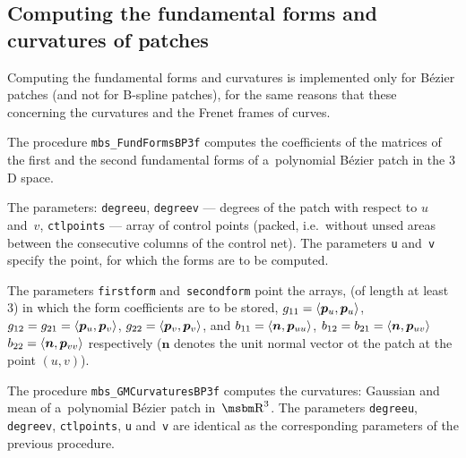 \subsection{Computing the fundamental forms and curvatures of patches}

Computing the fundamental forms and curvatures is implemented only
for B\'{e}zier patches (and not for B-spline patches), for the same
reasons that these concerning the curvatures and the Frenet frames
of curves.

\vspace{\bigskipamount}
The procedure \texttt{mbs\_FundFormsBP3f} computes the coefficients
of the matrices of the first and the second fundamental forms of
a~polynomial B\'{e}zier patch in the $3$D space.

The parameters: \texttt{degreeu}, \texttt{degreev} --- degrees of the patch
with respect to $u$ and~$v$, \texttt{ctlpoints} --- array of control
points (packed, i.e.\ without unsed areas between the consecutive
columns of the control net).
The parameters \texttt{u} and~\texttt{v} specify the point, for which
the forms are to be computed.

The parameters \texttt{firstform} and~\texttt{secondform} point the arrays,
(of length at least~$3$) in which the form coefficients are to be stored,
$g_{11}=\langle{\bm{p}_u},{\bm{p}_u}\rangle$, $g_{12}=g_{21}=\langle{\bm{p}_u},{\bm{p}_v}\rangle$,
$g_{22}=\langle{\bm{p}_v},{\bm{p}_v}\rangle$, and
$b_{11}=\langle{\bm{n}},{\bm{p}_{uu}}\rangle$, $b_{12}=b_{21}=\langle{\bm{n}},{\bm{p}_{uv}}\rangle$
$b_{22}=\langle{\bm{n}},{\bm{p}_{vv}}\rangle$ respectively ($\bm{n}$ denotes the unit
normal vector ot the patch at the point $(u,v)$).


\vspace{\bigskipamount}
The procedure \texttt{mbs\_GMCurvaturesBP3f} computes the curvatures: Gaussian
and mean of a~polynomial B\'{e}zier patch in~$\R^3$. The parameters
\texttt{degreeu}, \texttt{degreev}, \texttt{ctlpoints}, \texttt{u}
and~\texttt{v} are identical as the corresponding parameters of the previous
procedure.

